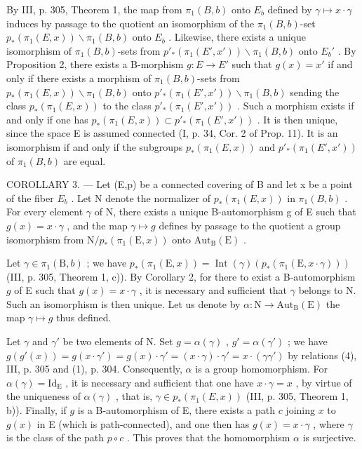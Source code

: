 By III, p. 305, Theorem 1, the map from \(\pi_1(B,b)\) onto \(E_b\) defined by \(\gamma \mapsto x \cdot \gamma\) induces by passage to the quotient an isomorphism of the \(\pi_1(B,b)\)-set \(p_*(\pi_1(E,x)) \backslash \pi_1(B,b)\) onto \(E_b\) . Likewise, there exists a unique isomorphism of \(\pi_1(B,b)\)-sets from \(p'_{*}(\pi_1(E',x')) \backslash \pi_1(B,b)\) onto \(E_b'\) . By Proposition 2, there exists a B-morphism \(g\colon E\to E'\) such that \(g(x)=x'\) if and only if there exists a morphism of \(\pi_1(B,b)\)-sets from \(p_*(\pi_1(E,x)) \backslash \pi_1(B,b)\) onto \(p'_{*}(\pi_1(E',x')) \backslash \pi_1(B,b)\) sending the class \(p_*(\pi_1(E,x))\) to the class \(p'_{*}(\pi_1(E',x'))\) . Such a morphism exists if and only if one has \(p_*(\pi_1(E,x)) \subset p'_{*}(\pi_1(E',x'))\) . It is then unique, since the space E is assumed connected (I, p. 34, Cor. 2 of Prop. 11). It is an isomorphism if and only if the subgroups \(p_*(\pi_1(E,x))\) and \(p'_{*}(\pi_1(E',x'))\) of \(\pi_1(B,b)\) are equal.

COROLLARY 3. --- Let (E,p) be a connected covering of B and let x be a point of the fiber \(E_{b}\) . Let N denote the normalizer of \(p_{*}(\pi_{1}(E,x))\) in \(\pi_{1}(B,b)\) . For every element \(\gamma\) of N, there exists a unique B-automorphism g of E such that \(g(x) = x \cdot \gamma\) , and the map \(\gamma \mapsto g\) defines by passage to the quotient a group isomorphism from \(\mathrm{N}/p_{*}(\pi_{1}(\mathrm{E},x))\) onto \(\mathrm{Aut}_{\mathrm{B}}(\mathrm{E})\) .

Let \(\gamma \in \pi_1(\mathrm{B}, b)\) ; we have \(p_*(\pi_1(\mathrm{E}, x)) = \operatorname{Int}(\gamma)(p_*(\pi_1(\mathrm{E}, x \cdot \gamma)))\) (III, p. 305, Theorem 1, c)). By Corollary 2, for there to exist a B-automorphism \(g\) of E such that \(g(x) = x \cdot \gamma\) , it is necessary and sufficient that \(\gamma\) belongs to N. Such an isomorphism is then unique. Let us denote by \(\alpha: \mathrm{N} \to \mathrm{Aut}_{\mathrm{B}}(\mathrm{E})\) the map \(\gamma \mapsto g\) thus defined.

Let \(\gamma\) and \(\gamma'\) be two elements of N. Set \(g = \alpha(\gamma)\) , \(g' = \alpha(\gamma')\) ; we have \(g(g'(x)) = g(x \cdot \gamma') = g(x) \cdot \gamma' = (x \cdot \gamma) \cdot \gamma' = x \cdot (\gamma\gamma')\) by relations (4), III, p. 305 and (1), p. 304. Consequently, \(\alpha\) is a group homomorphism. For \(\alpha(\gamma) = \mathrm{Id}_{\mathrm{E}}\) , it is necessary and sufficient that one have \(x \cdot \gamma = x\) , by virtue of the uniqueness of \(\alpha(\gamma)\) , that is, \(\gamma \in p_*(\pi_1(E, x))\) (III, p. 305, Theorem 1, b)). Finally, if \(g\) is a B-automorphism of E, there exists a path \(c\) joining \(x\) to \(g(x)\) in E (which is path-connected), and one then has \(g(x) = x \cdot \gamma\) , where \(\gamma\) is the class of the path \(p \circ c\) . This proves that the homomorphism \(\alpha\) is surjective.

